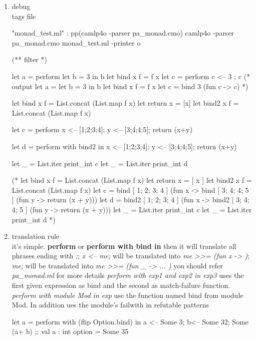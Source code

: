 

\begin{enumerate}
\item debug \\
  tags file
\begin{bluetext}
  "monad_test.ml" : pp(camlp4o -parser pa_monad.cmo)
  camlp4o -parser pa_monad.cmo monad_test.ml -printer o

  (** filter *)

  let a = perform let b = 3 in  b
  let bind x f = f x 
  let c = perform c <-- 3 ; c 
  (* output
  let a = let b = 3 in b
  let bind x f = f x
  let c = bind 3 (fun c -> c)
  *)



let bind x f = List.concat (List.map f x)
let return x = [x]
let bind2 x f = List.concat (List.map f x)

let c = perform 
    x <-- [1;2;3;4]; 
    y <-- [3;4;4;5]; 
    return (x+y)


let d = perform with bind2 in 
    x <-- [1;2;3;4]; 
    y <-- [3;4;4;5]; 
    return (x+y)

let _ = List.iter print_int c 
let _ = List.iter print_int d 

(*
let bind x f = List.concat (List.map f x)
let return x = [ x ]
let bind2 x f = List.concat (List.map f x)
let c =
  bind [ 1; 2; 3; 4 ]
    (fun x -> bind [ 3; 4; 4; 5 ] (fun y -> return (x + y)))
let d =
  bind2 [ 1; 2; 3; 4 ]
    (fun x -> bind2 [ 3; 4; 4; 5 ] (fun y -> return (x + y)))
let _ = List.iter print_int c
let _ = List.iter print_int d
*)  

\end{bluetext}

\item translation rule \\
  it's simple. \textbf{perform} or \textbf{perform with bind in } then
  it will translate all phrases ending with \textit{;}; \textit{x <--
 me;} will be translated into \textit{me >>= (fun x -> )};
\textit{me;} will be translated into \textit{me >>= (fun \_ -> ... )}
you should refer \textit{pa\_monad.ml} for more details 
\textit{perform with exp1 and exp2 in exp3} uses the first given
expression as bind and the second as match-failure function.
\textit{perform with module Mod in exp } use the function named bind
from module Mod. In addition ues the module's failwith in refutable patterns

\begin{alternate}
  let a = perform with (flip Option.bind) in a <-- Some 3;  b<-- Some 32; Some (a+ b) ;;
  val a : int option = Some 35
\end{alternate}


\end{enumerate}
